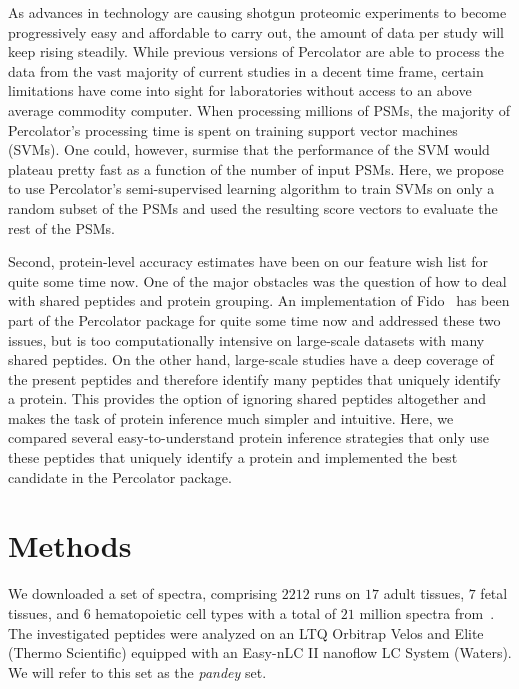 \documentclass{article}
\begin{document}
As advances in technology are causing shotgun proteomic experiments to
become progressively easy and affordable to carry out, the amount of
data per study will keep rising steadily. While previous versions of
Percolator are able to process the data from the vast majority of
current studies in a decent time frame, certain limitations have come
into sight for laboratories without access to an above average
commodity computer. When processing millions of PSMs, the majority of
Percolator’s processing time is spent on training support vector
machines (SVMs). One could, however, surmise that the performance of
the SVM would plateau pretty fast as a function of the number of input
PSMs. Here, we propose to use Percolator’s semi-supervised learning
algorithm to train SVMs on only a random subset of the PSMs and used
the resulting score vectors to evaluate the rest of the PSMs.

Second, protein-level accuracy estimates have been on our feature wish
list for quite some time now. One of the major obstacles was the
question of how to deal with shared peptides and protein grouping. An
implementation of Fido~\cite{serang2010efficient} has been part of the
Percolator package for quite some time now and addressed these two
issues, but is too computationally intensive on large-scale
datasets with many shared peptides. On the other hand, large-scale
studies have a deep coverage of the present peptides and therefore
identify many peptides that uniquely identify a protein. This
provides the option of ignoring shared peptides altogether and makes
the task of protein inference much simpler and intuitive. Here, we
compared several easy-to-understand protein inference strategies that
only use these peptides that uniquely identify a protein and
implemented the best candidate in the Percolator package.

\section*{Methods}

We downloaded a set of spectra, comprising $2212$ runs on $17$ adult
tissues, $7$ fetal tissues, and $6$ hematopoietic cell types with a
total of $21$ million spectra from~\cite{kim2014draft}. The
investigated peptides were analyzed on an LTQ Orbitrap Velos and Elite
(Thermo Scientific) equipped with an Easy-nLC II nanoflow LC System
(Waters). We will refer to this set as the {\em pandey} set.
\end{document}
